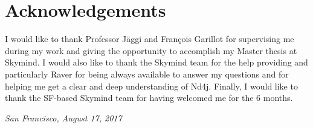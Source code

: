 \chapter*{Acknowledgements}

I would like to thank Professor Jäggi and François Garillot for supervising me during my work and giving the opportunity to accomplish my Master thesis at Skymind. I would also like to thank the Skymind team for the help providing and particularly Raver for being always available to answer my questions and for helping me get a clear and deep understanding of Nd4j. 
Finally, I would like to thank the SF-based Skymind team for having welcomed me for the 6 months.



\bigskip
 
\noindent\textit{San Francisco, August 17, 2017}
